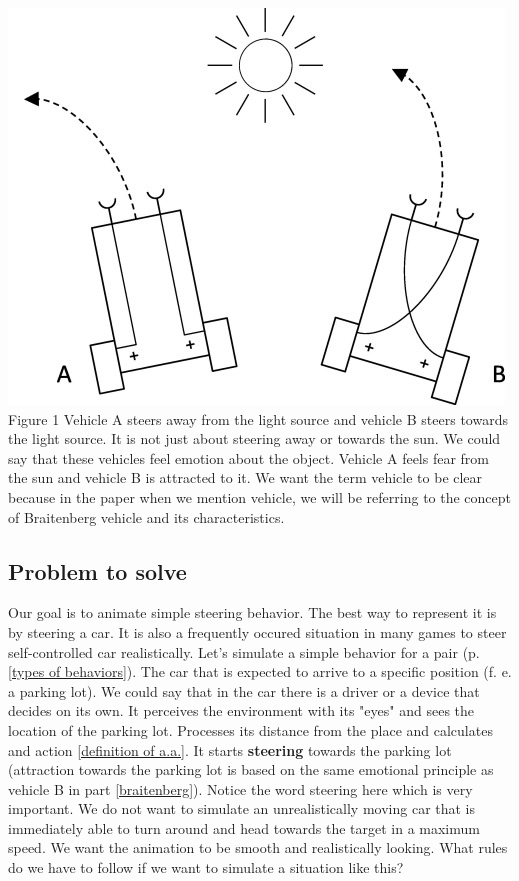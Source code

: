 \documentclass[10pt,twoside,english,a4paper]{article}
\begin{document}
\bigbreak

\includegraphics[scale=0.33]{braitenberg.jpg}
\quad Figure 1
\bigbreak
Vehicle A steers away from the light source and vehicle B steers 
towards the light source. It is not just about steering away or 
towards the sun. We could say that these vehicles feel emotion about 
the object. Vehicle A feels fear from the sun and vehicle B is 
attracted to it. We want the term vehicle to be clear because in 
the paper when we mention vehicle, we will be referring to the 
concept of Braitenberg vehicle and its characteristics. 

\subsection{Problem to solve} \label{problem to solve}
Our goal is to animate simple steering behavior. The best way to represent
it is by steering a car. It is also a frequently occured situation 
in many games to steer self-controlled car realistically.
Let’s simulate a simple behavior for a pair 
(p. \ref{types of behaviors}). The car that 
is expected to arrive to a specific position (f. e. a parking lot). 
We could say that in the car there is a driver or a device that decides on its own.
It  perceives the environment with its "eyes" and sees the location of the parking 
lot. Processes its distance from the place and calculates and action \ref{definition of a.a.}. 
It starts \textbf{steering} towards the parking lot (attraction towards the 
parking lot is based on the same emotional principle as vehicle B in part \ref{braitenberg}). 
Notice the word steering here which is very important. We do not want 
to simulate an unrealistically moving car that is immediately able to 
turn around and head towards the target in a maximum speed. We want the 
animation to be smooth and realistically looking. What rules do we 
have to follow if we want to simulate a situation like this?
\end{document}
